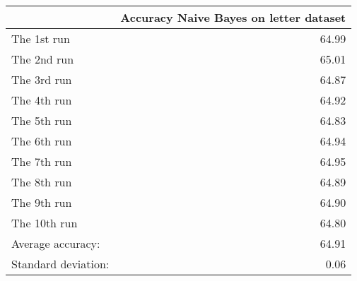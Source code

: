 \begin{tabular}{lr}
\toprule
{} &  Accuracy Naive Bayes on letter dataset \\
\midrule
The 1st run         &                                   64.99 \\
The 2nd run         &                                   65.01 \\
The 3rd run         &                                   64.87 \\
The 4th run         &                                   64.92 \\
The 5th run         &                                   64.83 \\
The 6th run         &                                   64.94 \\
The 7th run         &                                   64.95 \\
The 8th run         &                                   64.89 \\
The 9th run         &                                   64.90 \\
The 10th run        &                                   64.80 \\
Average accuracy:   &                                   64.91 \\
Standard deviation: &                                    0.06 \\
\bottomrule
\end{tabular}
